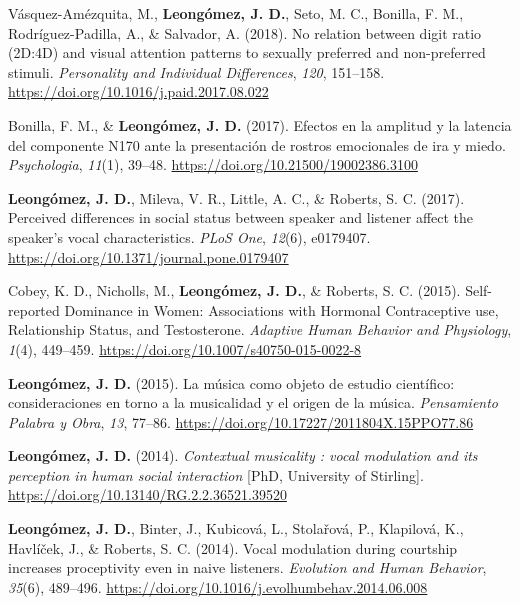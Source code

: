 \documentclass[11pt, a4paper]{awesome-cv}
\begin{document}
\leavevmode{}%
Vásquez-Amézquita, M., \textbf{Leongómez, J. D.}, Seto, M. C., Bonilla,
F. M., Rodríguez-Padilla, A., \& Salvador, A. (2018). {No relation
between digit ratio (2D:4D) and visual attention patterns to sexually
preferred and non-preferred stimuli}. \emph{Personality and Individual
Differences}, \emph{120}, 151--158.
\url{https://doi.org/10.1016/j.paid.2017.08.022}

\leavevmode{}%
Bonilla, F. M., \& \textbf{Leongómez, J. D.} (2017). {Efectos en la
amplitud y la latencia del componente N170 ante la presentaci{ó}n de
rostros emocionales de ira y miedo}. \emph{Psychologia}, \emph{11}(1),
39--48. \url{https://doi.org/10.21500/19002386.3100}

\leavevmode{}%
\textbf{Leongómez, J. D.}, Mileva, V. R., Little, A. C., \& Roberts, S.
C. (2017). {Perceived differences in social status between speaker and
listener affect the speaker's vocal characteristics}. \emph{PLoS One},
\emph{12}(6), e0179407.
\url{https://doi.org/10.1371/journal.pone.0179407}

\leavevmode{}%
Cobey, K. D., Nicholls, M., \textbf{Leongómez, J. D.}, \& Roberts, S. C.
(2015). {Self-reported Dominance in Women: Associations with Hormonal
Contraceptive use, Relationship Status, and Testosterone}.
\emph{Adaptive Human Behavior and Physiology}, \emph{1}(4), 449--459.
\url{https://doi.org/10.1007/s40750-015-0022-8}

\leavevmode{}%
\textbf{Leongómez, J. D.} (2015). {La m{ú}sica como objeto de estudio
cient{í}fico: consideraciones en torno a la musicalidad y el origen de
la m{ú}sica}. \emph{Pensamiento Palabra y Obra}, \emph{13}, 77--86.
\url{https://doi.org/10.17227/2011804X.15PPO77.86}

\leavevmode{}%
\textbf{Leongómez, J. D.} (2014). \emph{{Contextual musicality : vocal
modulation and its perception in human social interaction}} {[}PhD,
University of Stirling{]}.
\url{https://doi.org/10.13140/RG.2.2.36521.39520}

\leavevmode{}%
\textbf{Leongómez, J. D.}, Binter, J., Kubicová, L., Stolařová, P.,
Klapilová, K., Havlíček, J., \& Roberts, S. C. (2014). {Vocal modulation
during courtship increases proceptivity even in naive listeners}.
\emph{Evolution and Human Behavior}, \emph{35}(6), 489--496.
\url{https://doi.org/10.1016/j.evolhumbehav.2014.06.008}
\end{document}
